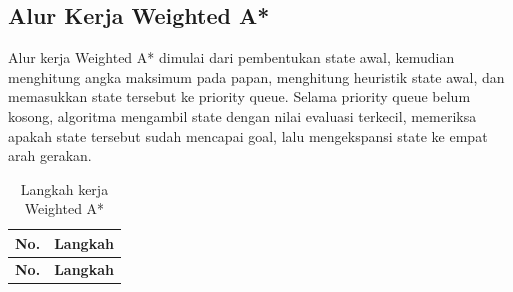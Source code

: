 \subsection{Alur Kerja Weighted A*}

Alur kerja Weighted A* dimulai dari pembentukan state awal, kemudian menghitung angka maksimum pada papan, menghitung heuristik state awal, dan memasukkan state tersebut ke priority queue. 
Selama priority queue belum kosong, algoritma mengambil state dengan nilai evaluasi terkecil, memeriksa apakah state tersebut sudah mencapai goal, lalu mengekspansi state ke empat arah gerakan.

\begin{longtable}{|p{1.2cm}|p{12.8cm}|}
	\caption{Langkah kerja Weighted A*} \\
	\hline
	\rowcolor{purple!15}
	\textbf{No.} & \textbf{Langkah} \\
	\hline
	\endfirsthead
	
	\hline
	\rowcolor{purple!15}
	\textbf{No.} & \textbf{Langkah} \\
	\hline
	\endhead
	

\end{longtable}
